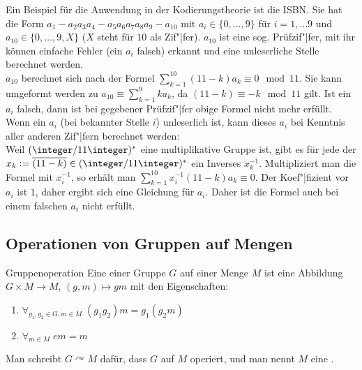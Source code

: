 \linie

\begin{Bsp}
    Ein Beispiel für die Anwendung in der Kodierungstheorie ist die ISBN.
    Sie hat die Form $a_1 - a_2 a_3 a_4 - a_5 a_6 a_7 a_8 a_9 - a_{10}$
    mit $a_i \in \{0, \dotsc, 9\}$ für $i = 1, \dotsc 9$ und
    $a_{10} \in \{0, \dotsc, 9, X\}$
    ($X$ steht für $10$ als Zif"|fer).
    $a_{10}$ ist eine sog. Prüfzif"|fer, mit ihr können einfache Fehler
    (ein $a_i$ falsch) erkannt und eine unleserliche Stelle
    berechnet werden.\\
    $a_{10}$ berechnet sich nach der Formel
    $\sum_{k=1}^{10} (11 - k) a_k \equiv 0 \mod 11$.
    Sie kann umgeformt werden zu $a_{10} \equiv \sum_{k=1}^9 k a_k$,
    da $(11 - k) \equiv -k \mod 11$ gilt.
    Ist ein $a_i$ falsch, dann ist bei gegebener Prüfzif"|fer obige
    Formel nicht mehr erfüllt.
    Wenn ein $a_i$ (bei bekannter Stelle $i$) unleserlich ist,
    kann dieses $a_i$ bei Kenntnis aller anderen Zif"|fern berechnet werden:\\
    Weil $(\integer/11\integer)^\ast$ eine multiplikative Gruppe ist,
    gibt es für jede der
    $x_k := \overline{(11 - k)} \in (\integer/11\integer)^\ast$
    ein Inverses $x_k^{-1}$.
    Multipliziert man die Formel mit $x_i^{-1}$, so erhält man
    $\sum_{k=1}^{10} x_i^{-1} (11 - k) a_k \equiv 0$.
    Der Koef"|fizient vor $a_i$ ist $1$, daher ergibt sich eine Gleichung für
    $a_i$.
    Daher ist die Formel auch bei einem falschen $a_i$ nicht erfüllt.
\end{Bsp}

\pagebreak

\subsection{%
    Operationen von Gruppen auf Mengen%
}

\begin{Def}{Gruppenoperation}
    Eine  einer Gruppe $G$ auf einer Menge $M$
    ist eine Abbildung $G \times M \rightarrow M$,
    $(g, m) \mapsto gm$ mit den Eigenschaften:
    \begin{enumerate}[label=(O\arabic*)]
        \item
        $\forall_{g_1, g_2 \in G, m \in M}\; (g_1 g_2) m = g_1 (g_2 m)$

        \item
        $\forall_{m \in M}\; em = m$
    \end{enumerate}
    Man schreibt $G \curvearrowright M$ dafür,
    dass $G$ auf $M$ operiert,
    und man nennt $M$ eine .
\end{Def}

